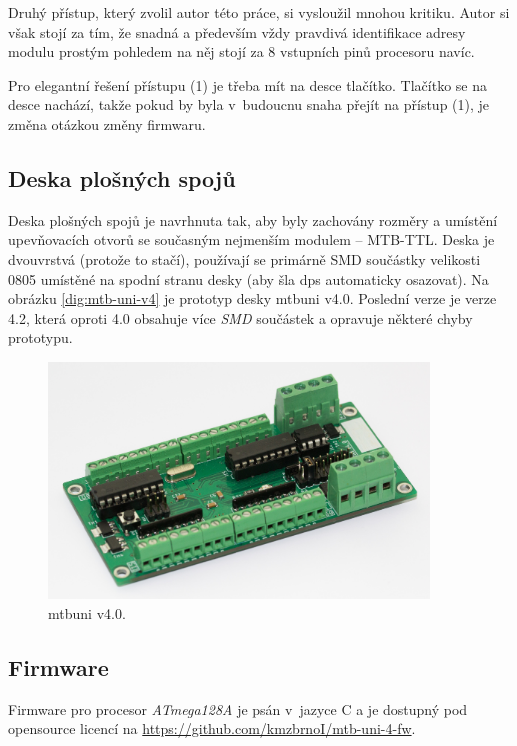 Druhý přístup, který zvolil autor této práce, si vysloužil mnohou kritiku.
Autor si však stojí za tím, že snadná a především vždy pravdivá identifikace
adresy modulu prostým pohledem na něj stojí za 8 vstupních pinů procesoru navíc.

Pro elegantní řešení přístupu (1) je třeba mít na desce tlačítko. Tlačítko se
na desce nachází, takže pokud by byla v~budoucnu snaha přejít na přístup (1),
je změna otázkou změny firmwaru.

\subsection{Deska plošných spojů}

Deska plošných spojů je navrhnuta tak, aby byly zachovány rozměry a umístění
upevňovacích otvorů se současným nejmenším modulem – MTB-TTL. Deska je dvouvrstvá
(protože to stačí), používají se primárně SMD součástky velikosti 0805 umístěné
na spodní stranu desky (aby šla \gls{dps} automaticky osazovat). Na obrázku
\ref{dig:mtb-uni-v4} je prototyp desky \gls{mtbuni} v4.0. Poslední verze je
verze 4.2, která oproti 4.0 obsahuje více \textit{SMD} součástek a opravuje
některé chyby prototypu.

\begin{figure}[ht]
\includegraphics[width=0.9\textwidth]{data/uni-v40-screw-all.jpg}
\caption{\gls{mtbuni} v4.0.}
\label{fig:mtb-uni-v4}
\end{figure}

\subsection{Firmware}

Firmware pro procesor \textit{ATmega128A} je psán v~jazyce C a je dostupný
pod opensource licencí na \url{https://github.com/kmzbrnoI/mtb-uni-4-fw}.

